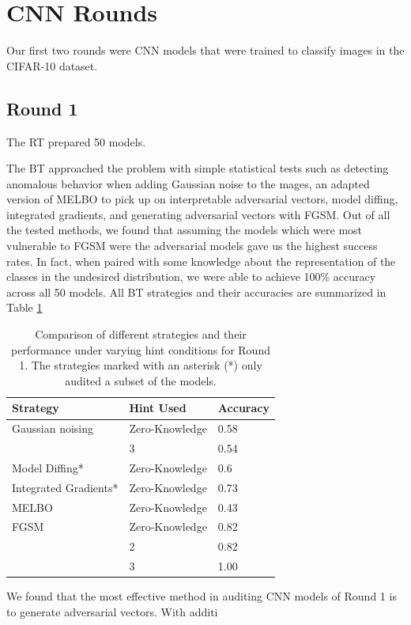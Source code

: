 \documentclass[letterpaper]{article} %
\begin{document}
\section{CNN Rounds}
Our first two rounds were CNN models that were trained to classify images in the CIFAR-10 dataset.

\subsection{Round 1}
The RT prepared 50 models.

The BT approached the problem with simple statistical tests such as detecting anomalous behavior when adding Gaussian noise to the mages, an adapted version of MELBO to pick up on interpretable adversarial vectors, model diffing, integrated gradients, and generating adversarial vectors with FGSM. Out of all the tested methods, we found that assuming the models which were most vulnerable to FGSM were the adversarial models gave us the highest success rates. In fact, when paired with some knowledge about the representation of the classes in the undesired distribution, we were able to achieve 100\% accuracy across all 50 models. All BT strategies and their accuracies are summarized in Table \ref{tab:R1BT}
\begin{table}[h!]
\centering
\begin{tabular}{|l|l|l|}
\hline
\textbf{Strategy} & \textbf{Hint Used} & \textbf{Accuracy} \\
\hline
Gaussian noising & Zero-Knowledge & 0.58 \\
 & 3 & 0.54 \\
Model Diffing* & Zero-Knowledge & 0.6 \\
Integrated Gradients* & Zero-Knowledge & 0.73 \\
MELBO & Zero-Knowledge & 0.43 \\
FGSM & Zero-Knowledge & 0.82 \\
 & 2 & 0.82 \\
 & 3 & 1.00 \\
\hline
\end{tabular}
\caption{Comparison of different strategies and their performance under varying hint conditions for Round 1. The strategies marked with an asterisk (*) only audited a subset of the models.} \label{tab:R1BT}
\end{table}

We found that the most effective method in auditing CNN models of Round 1 is to generate adversarial vectors. With additi
\end{document}
